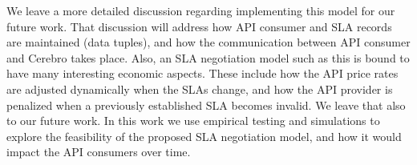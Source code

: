 We leave a more detailed discussion regarding implementing this model for our future work. That 
discussion will address how API consumer and SLA records are maintained (data tuples), and
how the communication between API consumer and Cerebro takes place. Also, an SLA negotiation
model such as this is bound to have many interesting economic aspects. These include how the
API price rates are adjusted dynamically when the SLAs change, and how the API provider is penalized
when a previously established SLA becomes invalid. We leave that also to our future work. In this work
we use empirical testing and simulations to explore the feasibility of the proposed SLA negotiation model,
and how it would impact the API consumers over time.
